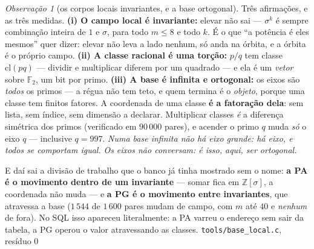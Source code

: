 \documentclass[11pt]{article}
\newcommand{\code}[1]{\texttt{\small #1}}
\newcommand{\Z}{\mathbb Z}
\newcommand{\F}{\mathbb F}
\theoremstyle{plain}
\theoremstyle{remark}
\newtheorem{obs}{Observação}
\begin{document}
\begin{obs}[os corpos locais invariantes, e a base ortogonal]\label{obs:baselocal}
Três afirmações, e as três medidas. \textbf{(i) O campo local é invariante:} elevar não sai ---
$\sigma^k$ é sempre combinação inteira de $1$ e $\sigma$, para todo $m\le8$ e todo $k$. É o que
``a potência é eles mesmos'' quer dizer: elevar não leva a lado nenhum, só anda na órbita, e a
órbita é o próprio campo. \textbf{(ii) A classe racional é uma torção:} $p/q$ tem classe
$\mathrm{cl}(pq)$ --- dividir e multiplicar diferem por um quadrado --- e ela é um \emph{vetor}
sobre $\F_2$, um bit por primo. \textbf{(iii) A base é infinita e ortogonal:} os eixos são
\emph{todos} os primos --- a régua não tem teto, e quem termina é o \emph{objeto}, porque uma
classe tem finitos fatores. A coordenada de uma classe \textbf{é a fatoração dela}: sem lista, sem
índice, sem dimensão a declarar. Multiplicar classes \emph{é} a diferença simétrica dos primos
(verificado em $90\,000$ pares), e acender o primo $q$ muda \emph{só} o eixo $q$ --- inclusive
$q=997$. \emph{Numa base infinita não há eixo grande: há eixo, e todos se comportam igual.} \emph{Os eixos não conversam:
é isso, aqui, ser ortogonal.}

E daí sai a divisão de trabalho que o banco já tinha mostrado sem o nome: \textbf{a PA é o
movimento dentro de um invariante} --- somar fica em $\Z[\sigma]$, a coordenada não muda --- e
\textbf{a PG é o movimento entre invariantes}, que atravessa a base ($1\,544$ de $1\,600$ pares
mudam de campo, com $m$ até $40$ e \emph{nenhum} de fora). No SQL isso apareceu literalmente: a PA varreu o endereço sem sair da tabela, a PG operou o
valor atravessando as classes. \hfill{\small\code{tools/base\_local.c}, resíduo $0$}
\end{obs}
\end{document}
